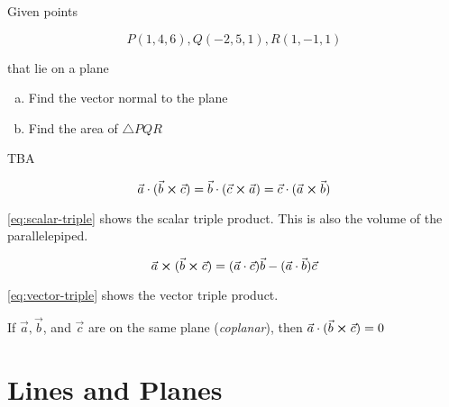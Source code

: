 \begin{example}
	Given points

	\begin{equation*}
		P(1,4,6), Q(-2,5,1), R(1,-1,1)
	\end{equation*}

	that lie on a plane

	\begin{enumerate}[a)]
		\item Find the vector normal to the plane
		\item Find the area of $\triangle{PQR}$
	\end{enumerate}
\end{example}

\begin{sol}
	TBA
\end{sol}

\begin{definition}
	\begin{equation} \label{eq:scalar-triple}
		\vec a \cdot (\vec b \cross \vec c) = \vec b \cdot (\vec c \cross \vec a) = \vec c \cdot (\vec a \cross \vec b)
	\end{equation}

	\cref*{eq:scalar-triple} shows the scalar triple product. This is also the volume of the parallelepiped.

	\begin{equation} \label{eq:vector-triple}
		\vec a \cross (\vec b \cross \vec c) = (\vec a \cdot \vec c) \vec b - (\vec a \cdot \vec b) \vec c
	\end{equation}

	\cref*{eq:vector-triple} shows the vector triple product.
\end{definition}

\begin{lemma}
	If $\vec a, \vec b$, and $\vec c$ are on the same plane (\textit{coplanar}), then $\vec a \cdot (\vec b \cross \vec c) = 0$
\end{lemma}

\section{Lines and Planes}

